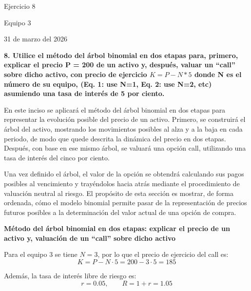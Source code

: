 \documentclass{article}\usepackage[]{graphicx}\usepackage[]{xcolor}
\begin{document}
\newpage
\begin{titlepage}
    \centering
    
    \vspace*{3cm}
    
    {\LARGE Ejercicio 8 \par}
    
    \vspace{0.8cm}
    
    {\Large Equipo 3 \par}
    
    \vspace{0.8cm}
    
    {\Large 31 de marzo del 2026 \par}
    
\end{titlepage}

\newpage
\textbf{8. Utilice el método del árbol binomial en dos etapas para, primero, explicar el precio P = 200 de un activo y, después, valuar un ``call'' sobre dicho activo, con precio de ejercicio $K=P-N*5$ donde N es el número de su equipo, (Eq. 1: use N=1, Eq. 2: use N=2, etc) asumiendo una tasa de interés de 5 por ciento.}

En este inciso se aplicará el método del árbol binomial en dos etapas para representar la evolución posible del precio de un activo. Primero, se construirá el árbol del activo, mostrando los movimientos posibles al alza y a la baja en cada periodo, de modo que quede descrita la dinámica del precio en dos etapas. Después, con base en ese mismo árbol, se valuará una opción call, utilizando una tasa de interés del cinco por ciento.

Una vez definido el árbol, el valor de la opción se obtendrá calculando sus pagos posibles al vencimiento y trayéndolos hacia atrás mediante el procedimiento de valuación neutral al riesgo. El propósito de esta sección es mostrar, de forma ordenada, cómo el modelo binomial permite pasar de la representación de precios futuros posibles a la determinación del valor actual de una opción de compra.

\newpage
\textbf{Método del árbol binomial en dos etapas: explicar el precio de un activo y, valuación de un ``call'' sobre dicho activo}

Para el equipo 3 se tiene \(N=3\), por lo que el precio de ejercicio del call es:
\[
K=P-N\cdot 5=200-3\cdot 5=185
\]

Además, la tasa de interés libre de riesgo es:
\[
r=0.05,
\qquad R=1+r=1.05
\]
\end{document}
